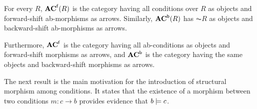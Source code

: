\iffull
\begin{definition}
  \label{def:ab-morphism categories}
For every $R$, $\mathbf{AC}^{\mathsf{f}}(R)$  is the category having all conditions over $R$ as objects and  forward-shift ab-morphisms as arrows.  Similarly, $\mathbf{AC}^{\mathsf{b}}(R)$ has $\AC R$ as objects and backward-shift ab-morphisms as arrows.

Furthermore, $\mathbf{AC}^{{\mathsf{f}}}$ is the category having all ab-conditions as objects and forward-shift morphisms as arrows, and  $\mathbf{AC}^{{\mathsf{b}}}$ is the category having the same objects and backward-shift morphisms as arrows. 
\end{definition}
%
\fi


The next result is the main motivation for the introduction of structural morphism among conditions. It states that the existence of a morphism between two conditions $m: c \to b$ provides evidence that $b\models c$.

